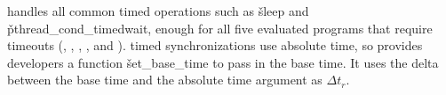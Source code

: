 
\xxx handles all common timed operations such as \v{sleep} and
\v{pthread\_cond\_timedwait}, enough for all five evaluated programs
that require timeouts (\pbzip, \bdb, \mplayer, \imagick, and \redis).
\pthread timed synchronizations use absolute time, so \xxx provides
developers a function \v{set\_base\_time} to pass in the base time.  It
uses the delta between the base time and the absolute time argument as $\Delta
t_r$.







